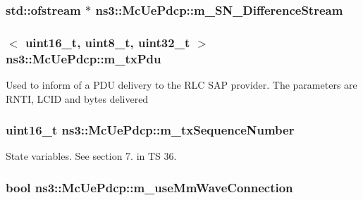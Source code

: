 \subsubsection[{\texorpdfstring{m\+\_\+\+S\+N\+\_\+\+Difference\+Stream}{m_SN_DifferenceStream}}]{\setlength{\rightskip}{0pt plus 5cm}std\+::ofstream $\ast$ ns3\+::\+Mc\+Ue\+Pdcp\+::m\+\_\+\+S\+N\+\_\+\+Difference\+Stream\hspace{0.3cm}{\ttfamily [private]}}\hypertarget{classns3_1_1McUePdcp_a36a78a83ed664f5672d3fede9b7e635d}{}\label{classns3_1_1McUePdcp_a36a78a83ed664f5672d3fede9b7e635d}
\subsubsection[{\texorpdfstring{m\+\_\+tx\+Pdu}{m_txPdu}}]{$<$ uint16\+\_\+t, uint8\+\_\+t, uint32\+\_\+t $>$ ns3\+::\+Mc\+Ue\+Pdcp\+::m\+\_\+tx\+Pdu\hspace{0.3cm}{\ttfamily [protected]}}\hypertarget{classns3_1_1McUePdcp_abe2ab1ab1b1e577e104aeb580b810558}{}\label{classns3_1_1McUePdcp_abe2ab1ab1b1e577e104aeb580b810558}
Used to inform of a P\+DU delivery to the R\+LC S\+AP provider. The parameters are R\+N\+TI, L\+C\+ID and bytes delivered 
\subsubsection[{\texorpdfstring{m\+\_\+tx\+Sequence\+Number}{m_txSequenceNumber}}]{\setlength{\rightskip}{0pt plus 5cm}uint16\+\_\+t ns3\+::\+Mc\+Ue\+Pdcp\+::m\+\_\+tx\+Sequence\+Number\hspace{0.3cm}{\ttfamily [private]}}\hypertarget{classns3_1_1McUePdcp_a40f14de1c02f288a87aa5f70501cf31e}{}\label{classns3_1_1McUePdcp_a40f14de1c02f288a87aa5f70501cf31e}
State variables. See section 7. in TS 36. 
\subsubsection[{\texorpdfstring{m\+\_\+use\+Mm\+Wave\+Connection}{m_useMmWaveConnection}}]{\setlength{\rightskip}{0pt plus 5cm}bool ns3\+::\+Mc\+Ue\+Pdcp\+::m\+\_\+use\+Mm\+Wave\+Connection\hspace{0.3cm}{\ttfamily [private]}}\hypertarget{classns3_1_1McUePdcp_ae995f7a56173ed7e2ba8f215c928e5a4}{}\label{classns3_1_1McUePdcp_ae995f7a56173ed7e2ba8f215c928e5a4}
